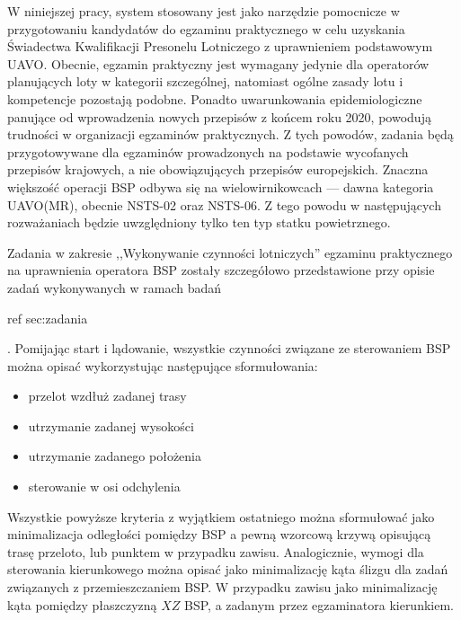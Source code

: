 W niniejszej pracy, system stosowany jest jako narzędzie pomocnicze w przygotowaniu kandydatów do egzaminu praktycznego w celu uzyskania Świadectwa Kwalifikacji Presonelu Lotniczego z uprawnieniem podstawowym UAVO. Obecnie, egzamin praktyczny jest wymagany jedynie dla operatorów planujących loty w kategorii szczególnej\cite{ulc2019}, natomiast ogólne zasady lotu i kompetencje pozostają podobne. Ponadto uwarunkowania epidemiologiczne panujące od wprowadzenia nowych przepisów z końcem roku 2020, powodują trudności w organizacji egzaminów praktycznych. Z tych powodów, zadania będą przygotowywane dla egzaminów prowadzonych na podstawie wycofanych przepisów krajowych, a nie obowiązujących przepisów europejskich. Znaczna większość operacji BSP odbywa się na wielowirnikowcach --- dawna kategoria UAVO(MR), obecnie NSTS-02 oraz NSTS-06. Z tego powodu w następujących rozważaniach będzie uwzględniony tylko ten typ statku powietrznego.

Zadania w zakresie ,,Wykonywanie czynności lotniczych'' egzaminu praktycznego na uprawnienia operatora BSP\cite{ulc2014} zostały szczegółowo przedstawione przy opisie zadań wykonywanych w ramach badań \begin{todo}ref sec:zadania\end{todo}. Pomijając start i lądowanie, wszystkie czynności związane ze sterowaniem BSP można opisać wykorzystując następujące sformułowania:
\begin{itemize}
    \item przelot wzdłuż zadanej trasy
    \item utrzymanie zadanej wysokości
    \item utrzymanie zadanego położenia
    \item sterowanie w osi odchylenia
\end{itemize}
Wszystkie powyższe kryteria z wyjątkiem ostatniego można sformułować jako minimalizacja odległości pomiędzy BSP a pewną wzorcową krzywą opisującą trasę przeloto, lub punktem w przypadku zawisu. Analogicznie, wymogi dla sterowania kierunkowego można opisać jako minimalizację kąta ślizgu dla zadań związanych z przemieszczaniem BSP. W przypadku zawisu jako minimalizację kąta pomiędzy płaszczyzną $ XZ $ BSP, a zadanym przez egzaminatora kierunkiem.

